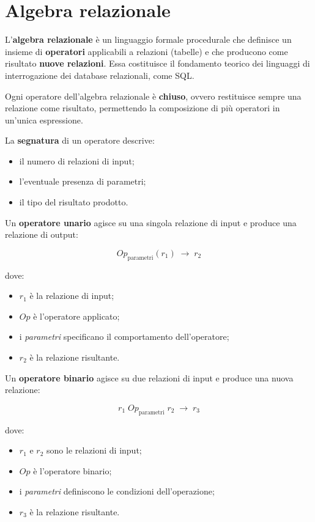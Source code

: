 \section{Algebra relazionale}

L'\textbf{algebra relazionale} è un linguaggio formale procedurale che
definisce un insieme di \textbf{operatori} applicabili a relazioni
(tabelle) e che producono come risultato \textbf{nuove relazioni}.
Essa costituisce il fondamento teorico dei linguaggi di interrogazione
dei database relazionali, come SQL.

Ogni operatore dell'algebra relazionale è \textbf{chiuso}, ovvero
restituisce sempre una relazione come risultato, permettendo la
composizione di più operatori in un'unica espressione.

La \textbf{segnatura} di un operatore descrive:
\begin{itemize}
	\item il numero di relazioni di input;
	\item l'eventuale presenza di parametri;
	\item il tipo del risultato prodotto.
\end{itemize}

Un \textbf{operatore unario} agisce su una singola relazione di input e
produce una relazione di output:

\[
Op_{\text{parametri}}(r_1) \;\rightarrow\; r_2
\]

dove:
\begin{itemize}
	\item $r_1$ è la relazione di input;
	\item $Op$ è l'operatore applicato;
	\item i \emph{parametri} specificano il comportamento dell'operatore;
	\item $r_2$ è la relazione risultante.
\end{itemize}

Un \textbf{operatore binario} agisce su due relazioni di input e produce
una nuova relazione:

\[
r_1 \; Op_{\text{parametri}} \; r_2 \;\rightarrow\; r_3
\]

dove:
\begin{itemize}
	\item $r_1$ e $r_2$ sono le relazioni di input;
	\item $Op$ è l'operatore binario;
	\item i \emph{parametri} definiscono le condizioni dell'operazione;
	\item $r_3$ è la relazione risultante.
\end{itemize}
